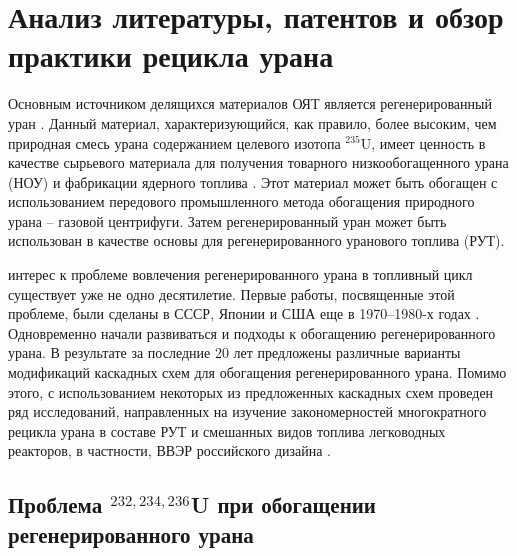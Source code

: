 \chapter{Анализ литературы, патентов и обзор практики рецикла урана}\label{ch1}

Основным источником делящихся материалов ОЯТ является регенерированный уран \cite{smirnovEvolutionIsotopicComposition2012}. Данный материал, характеризующийся, как правило, более высоким, чем природная смесь урана содержанием целевого изотопа $^{235}$U, имеет ценность в качестве сырьевого материала для получения товарного низкообогащенного урана (НОУ) и фабрикации ядерного топлива \cite{NikipelovNikipelovSudby,delculAnalysisReuseUranium2009,dyachenkoIspolzovanieRegenerirovannogoUrana2012,proselkovAnalizVozmozhnostiIspolzovaniya2003}. Этот материал может быть обогащен с использованием передового промышленного метода обогащения природного урана -- газовой центрифуги. Затем регенерированный уран может быть использован в качестве основы для регенерированного уранового топлива (РУТ).

интерес к проблеме вовлечения регенерированного урана в топливный цикл существует уже не одно десятилетие. Первые работы, посвященные этой проблеме, были сделаны в СССР, Японии и США еще в 1970–1980-х годах \cite{kazukihidaSimultaneousEvaluationEffects1986,sidenkoIssledovanieKaskadnyhShem,psheninZaklyuchitelnyyOtchetNIR2012,delagarzaUranium236LightWater1977,raysIzgotovlenieOksidnogoTopliva1994,zhiroEkonomicheskiePreimushchestvaPererabotki1997,lebedevZamknutyyToplivnyyCikl1999}. Одновременно начали развиваться и подходы к обогащению регенерированного урана. В результате за последние 20 лет предложены различные варианты модификаций каскадных схем для обогащения регенерированного урана. Помимо этого, с использованием некоторых из предложенных каскадных схем проведен ряд исследований, направленных на изучение закономерностей многократного рецикла урана в составе РУТ и смешанных видов топлива легководных реакторов, в частности, ВВЭР российского дизайна \cite{smirnovEvolutionIsotopicComposition2012,kazukihidaSimultaneousEvaluationEffects1986,blandinskiySoglasovannyyPodhodModelirovaniyu2018,colemanEvaluationMultipleSelfrecycling2010}. 

\section{Проблема $^{232,234,236}$U при обогащении регенерированного урана}


